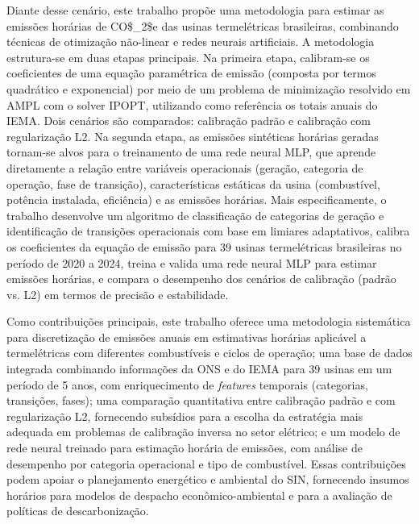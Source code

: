 Diante desse cenário, este trabalho propõe uma metodologia para estimar as emissões horárias de \ac{CO$_2$e} das usinas termelétricas brasileiras, combinando técnicas de otimização não-linear e redes neurais artificiais. A metodologia estrutura-se em duas etapas principais. Na primeira etapa, calibram-se os coeficientes de uma equação paramétrica de emissão (composta por termos quadrático e exponencial) por meio de um problema de minimização resolvido em \ac{AMPL} com o solver \ac{IPOPT}, utilizando como referência os totais anuais do \ac{IEMA}. Dois cenários são comparados: calibração padrão e calibração com regularização L2. Na segunda etapa, as emissões sintéticas horárias geradas tornam-se alvos para o treinamento de uma rede neural \ac{MLP}, que aprende diretamente a relação entre variáveis operacionais (geração, categoria de operação, fase de transição), características estáticas da usina (combustível, potência instalada, eficiência) e as emissões horárias. Mais especificamente, o trabalho desenvolve um algoritmo de classificação de categorias de geração e identificação de transições operacionais com base em limiares adaptativos, calibra os coeficientes da equação de emissão para 39 usinas termelétricas brasileiras no período de 2020 a 2024, treina e valida uma rede neural \ac{MLP} para estimar emissões horárias, e compara o desempenho dos cenários de calibração (padrão vs. L2) em termos de precisão e estabilidade.

Como contribuições principais, este trabalho oferece uma metodologia sistemática para discretização de emissões anuais em estimativas horárias aplicável a termelétricas com diferentes combustíveis e ciclos de operação; uma base de dados integrada combinando informações da \ac{ONS} e do \ac{IEMA} para 39 usinas em um período de 5 anos, com enriquecimento de \textit{features} temporais (categorias, transições, fases); uma comparação quantitativa entre calibração padrão e com regularização L2, fornecendo subsídios para a escolha da estratégia mais adequada em problemas de calibração inversa no setor elétrico; e um modelo de rede neural treinado para estimação horária de emissões, com análise de desempenho por categoria operacional e tipo de combustível. Essas contribuições podem apoiar o planejamento energético e ambiental do \ac{SIN}, fornecendo insumos horários para modelos de despacho econômico-ambiental e para a avaliação de políticas de descarbonização.